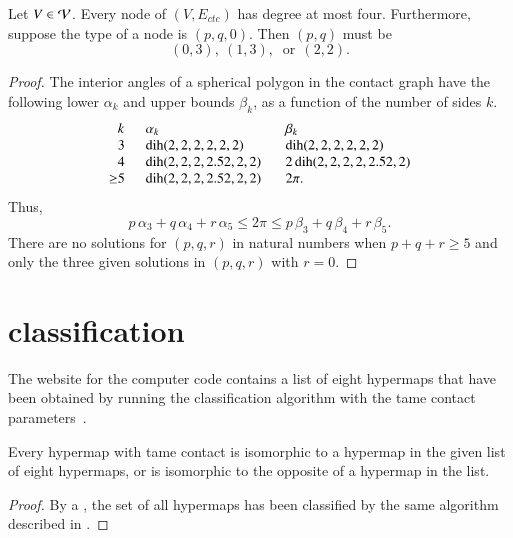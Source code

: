\documentclass{llncs}
\def\op#1{{\hbox{#1}}}
\begin{document}
\begin{lemma}\label{lemma:no-5} 
  Let $V\in {\mathcal V}$.  Every node of $(V,E_{ctc})$ has degree at most
  four.  Furthermore, suppose the type of a node is $(p,q,0)$.  Then
  $(p,q)$ must be
\[
(0,3),~(1,3),~\text{ or}~~(2,2).
\]
\end{lemma}

\begin{proof} The interior angles of a spherical polygon in the
  contact graph have the following lower $\alpha_k$ and upper bounds
  $\beta_k$, as a function of the number of sides $k$.
\begin{equation}
\begin{array}{lllll}
  \phantom{\ge}k~~&\alpha_k & \beta_k\\
  \phantom{\ge}3~~&\op{dih}(2,2,2,2,2,2)  &\op{dih}(2,2,2,2,2,2)\\
  \phantom{\ge}4~~&\op{dih}(2,2,2,2.52,2,2) &2\,\op{dih}(2,2,2,2,2.52,2)\\
  {\ge}5~~& \op{dih}(2,2,2,2.52,2,2) ~~~& 2\pi.
\end{array}
\end{equation}
Thus,
\[
  p\,\alpha_3 + q\,\alpha_4 +r\, \alpha_5 
\le 2\pi \le p\,\beta_3 + q\,\beta_4 + r \,\beta_5.
\]
There are no solutions for
$(p,q,r)$ in natural numbers when $p+q+r\ge 5$ and
 only the three given solutions in $(p,q,r)$ with $r=0$.
\end{proof}



\section{classification}

The website for the computer code  contains a list of eight hypermaps
that have been obtained by running the classification algorithm with
the tame contact parameters~\cite{website:FlyspeckProject}.

\begin{lemma}\cutrate{}
  \label{lemma:contact-classification} Every hypermap with tame
  contact is isomorphic to a hypermap in the given list of eight
  hypermaps, or is isomorphic to the opposite of a hypermap in the
  list.  %
\end{lemma}

\begin{proof}
  By a , %
 the set of all hypermaps has been classified by the same
  algorithm described in \cite{dsp}.
\end{proof}
\end{document}
